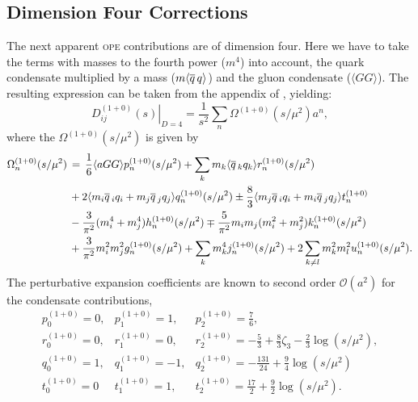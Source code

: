 \documentclass[../../index.tex]{subfiles}
\begin{document}
\subsection{Dimension Four Corrections}
The next apparent \textsc{ope} contributions are of dimension four. Here we have
to take the terms with masses to the fourth power (\(m^4\)) into account, the
quark condensate multiplied by a mass (\(m \langle \overline{q}\, q \rangle\)) and the
gluon condensate (\(\langle GG \rangle\)). The resulting expression can be taken
from the appendix of \cite{Pich1999}, yielding:
\begin{equation}
  \left. D_{ij}^{(1+0)}(s) \right\rvert_{D=4} = \frac{1}{s^2} \sum_n \Omega^{(1+0)}(s/\mu^2)a^n,
\end{equation}
where the \(\Omega^{(1+0)}(s/\mu^2)\) is given by
\begin{equation}
  \begin{split}
    \Omega_n^{(1+0)} (s/\mu^2) &\,=\, \frac{1}{6}\langle aGG \rangle p_n^{(1+0)}(s/\mu^2) + \sum_k m_k \langle \overline{q}\,_k q_k \rangle r_n^{(1+0)}(s/\mu^2) \\
    &\,+ 2\langle m_i \overline{q}\,_i q_i + m_j \overline{q}\,_j q_j \rangle q_n^{(1+0)} (s/\mu^2) \pm \frac{8}{3} \langle m_j \overline{q}\,_i q_i + m_i \overline{q}\,_j q_j \rangle t_n^{(1+0)} \\
    &\,- \frac{3}{\pi^2} (m_i^4 + m_j^4) h_n^{(1+0)} (s/\mu^2) \mp \frac{5}{\pi^2} m_i m_j (m_i^2 + m_j^2) k_n^{(1+0)}(s/\mu^2)\\
    &\,+ \frac{3}{\pi^2} m_i^2 m_j^2 g_n^{(1+0)}(s/\mu^2) + \sum_k m_k^4
    j_n^{(1+0)}(s/\mu^2) + 2 \sum_{k \neq l} m_k^2 m_l^2 u_n^{(1+0)}(s/\mu^2).
  \end{split}
\end{equation}
The perturbative expansion coefficients are known to second order
\(\mathcal{O}(a^2)\) for the condensate contributions,
\begin{equation}
  \begin{array}{lll}
    p_0^{(1+0)}=0, & p_1^{(1+0)}=1, & p_2^{(1+0)}=\frac{7}{6}, \\
    r_0^{(1+0)}=0, & r_1^{(1+0)}=0, & r_2^{(1+0)}=-\frac{5}{3}+\frac{8}{3}\zeta_3-\frac{2}{3}\log(s/\mu^2), \\
    q_0^{(1+0)}=1, & q_1^{(1+0)}=-1, & q_2^{(1+0)}=-\frac{131}{24}+\frac{9}{4}\log(s/\mu^2) \\
    t_0^{(1+0)}=0 & t_1^{(1+0)}=1, & t_2^{(1+0)}=\frac{17}{2}+\frac{9}{2}\log(s/\mu^2).
  \end{array}
\end{equation}
\end{document}
